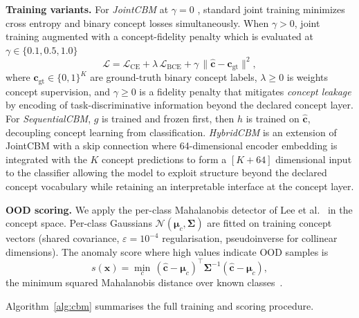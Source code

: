 \documentclass[journal]{IEEEtran}
\begin{document}
\textbf{Training variants.}
For \emph{JointCBM}  at $\gamma{=}0$ , standard joint training minimizes cross entropy and binary concept losses simultaneously. When $\gamma{>}0$, joint training augmented with a concept-fidelity penalty which is evaluated at $\gamma\in\{0.1,0.5,1.0\}$
\begin{equation}
  \mathcal{L} = \mathcal{L}_{\mathrm{CE}} + \lambda\,\mathcal{L}_{\mathrm{BCE}}
    + \gamma\,\|\hat{\mathbf{c}} - \mathbf{c}_{\text{gt}}\|^2,
\end{equation}
where $\mathbf{c}_{\text{gt}}\in\{0,1\}^K$ are ground-truth binary concept labels, $\lambda{\geq}0$  is weights concept supervision, and $\gamma{\geq}0$
is a fidelity penalty that mitigates \emph{concept leakage} by encoding of task-discriminative information beyond the declared concept layer. For \emph{SequentialCBM}, $g$ is trained and frozen first, then  $h$ is trained on $\hat{\mathbf{c}}$, decoupling concept learning from classification.
\emph{HybridCBM}  is an extension of JointCBM with a skip connection where 64-dimensional encoder embedding is integrated with the $K$ concept predictions to form a $[K{+}64]$ dimensional input to the classifier allowing the model to exploit structure beyond the declared concept vocabulary while retaining an interpretable interface at the concept layer.

\textbf{OOD scoring.}
We apply the per-class Mahalanobis detector of Lee et al.~\cite{lee2018simple} in the concept space. Per-class Gaussians $\mathcal{N}(\boldsymbol{\mu}_c,\boldsymbol{\Sigma})$ are fitted on training concept vectors (shared covariance, $\varepsilon{=}10^{-4}$ regularisation,
pseudoinverse for collinear dimensions). The anomaly score where high
values indicate OOD samples is
\begin{equation}
  s(\mathbf{x}) = \min_c\,(\hat{\mathbf{c}}-\boldsymbol{\mu}_c)^\top
  \boldsymbol{\Sigma}^{-1}(\hat{\mathbf{c}}-\boldsymbol{\mu}_c),
  \label{eq:mahal}
\end{equation}
the minimum squared Mahalanobis distance over known classes~\cite{fort2021exploring}.

Algorithm~\ref{alg:cbm} summarises the full training and scoring procedure.
\end{document}
